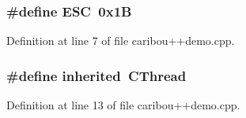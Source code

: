 \subsubsection[{E\+SC}]{\setlength{\rightskip}{0pt plus 5cm}\#define E\+SC~0x1B}\label{caribou_09_09demo_8cpp_a4af1b6159e447ba72652bb7fcdfa726e}


Definition at line 7 of file caribou++demo.\+cpp.

\subsubsection[{inherited}]{\setlength{\rightskip}{0pt plus 5cm}\#define inherited~C\+Thread}\label{caribou_09_09demo_8cpp_a3920e3b7cb0909b941b2409493acf8f1}


Definition at line 13 of file caribou++demo.\+cpp.

